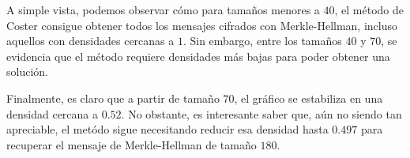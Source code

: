     

    A simple vista, podemos observar cómo para tamaños menores a $40$, el método de Coster consigue obtener todos los mensajes cifrados con Merkle-Hellman, incluso aquellos con densidades cercanas a $1$. Sin embargo, entre los tamaños $40$ y $70$, se evidencia que el método requiere densidades más bajas para poder obtener una solución.
    
    Finalmente, es claro que a partir de tamaño $70$, el gráfico se estabiliza en una densidad cercana a $0.52$. No obstante, es interesante saber que, aún no siendo tan apreciable, el metódo sigue necesitando reducir esa densidad hasta $0.497$ para recuperar el mensaje de Merkle-Hellman de tamaño $180$.

\endinput